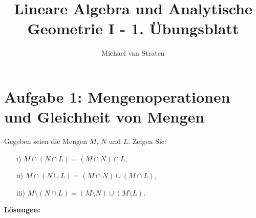 \documentclass{exam}
\title{Lineare Algebra und Analytische Geometrie I - 1. Übungsblatt}
\author{Michael van Straten}
\begin{document}
\maketitle
\section*{Aufgabe 1: Mengenoperationen und Gleichheit von Mengen}
Gegeben seien die Mengen $M$, $N$ und $L$. Zeigen Sie:
\begin{enumerate}
    \item[i)] $M \cap (N \cap L) = (M \cap N) \cap L$,
    \item[ii)] $M \cap (N \cup L) = (M \cap N) \cup (M \cap L)$,
    \item[iii)] $M \setminus (N \cap L) = (M \setminus N) \cup (M \setminus L)$.
\end{enumerate}
\textbf{Lösungen:}
\end{document}
